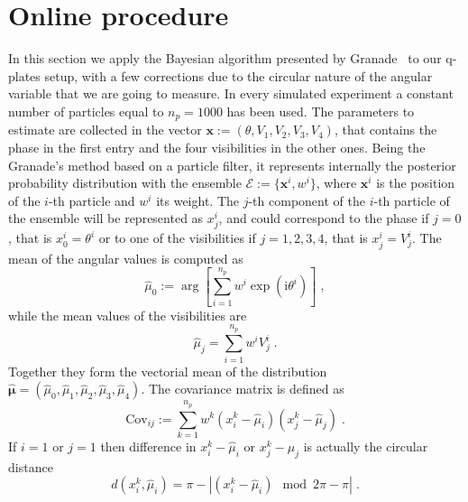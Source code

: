 \documentclass[aps, pra, 10pt, twocolumn, superscriptaddress,floatfix]{revtex4-1}
\newcommand{\mi}{\mathrm{i}} %
\begin{document}
\section{Online procedure}
%
In this section we apply the Bayesian algorithm presented by Granade~\cite{Granade2012} to our q-plates setup, with a few corrections due to the circular nature of the angular variable that we are going to measure. In every simulated experiment  a constant number of particles equal to $n_p = 1000$ has been used. The parameters to estimate are collected in the vector $\boldsymbol{x} := \left( \theta, V_1, V_2, V_3, V_4 \right)$, that contains the phase in the first entry and the four visibilities in the other ones. Being the Granade's method based on a particle filter, it represents internally the posterior probability distribution with the ensemble $\mathcal{E} := \lbrace \boldsymbol{x}^i, w^i \rbrace$, where $\boldsymbol{x}^i$ is the position of the $i$-th particle and $w^i$ its weight. The $j$-th component of the $i$-th particle of the ensemble will be represented as $x_j^i$, and could correspond to the phase if $j=0$, that is $x^i_0 = \theta^i$ or to one of the visibilities if $j=1, 2, 3, 4$, that is $x^i_j = V^i_j$. The mean of the angular values is computed as
%
\begin{equation}
	\hat{\mu}_0 := \arg \left[ \sum_{i=1}^{n_{p}} w^i \exp \left( \mi \theta^i \right) \right] \; ,
\end{equation}
%
while the mean values of the visibilities are
%
\begin{equation}
	\hat{\mu}_j = \sum_{i=1}^{n_p} w^i V^i_j \; .
\end{equation}
%
Together they form the vectorial mean of the distribution $\boldsymbol{\hat{\mu}} = (\hat{\mu}_0, \hat{\mu}_1, \hat{\mu}_2, \hat{\mu}_3, \hat{\mu}_4)$. The covariance matrix is defined as
%
\begin{equation}
	\text{Cov}_{ij} := \sum_{k=1}^{n_{p}} w^k (x^k_i - \hat{\mu}_i)  (x^k_j - \hat{\mu}_j) \; .
\end{equation}
%
If $i=1$ or $j=1$ then difference in $x^k_i - \hat{\mu}_i$ or $x^k_j - \hat{\mu}_j$ is actually the circular distance
%
\begin{equation}
	d(x^k_i, \hat{\mu}_i) = \pi - | (x^k_i - \hat{\mu}_i) \mod 2 \pi - \pi| \; .
\end{equation}
%
\end{document}
